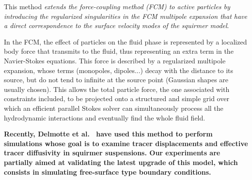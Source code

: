 This method \textit{extends the force-coupling method (FCM) to active particles by introducing the regularized singularities in the FCM multipole expansion that have a direct correspondence to the surface velocity modes of the squirmer model}.

In the FCM, the effect of particles on the fluid phase is represented by a localized body force that transmits to the fluid, thus representing an extra term in the Navier-Stokes equations. This force is described by a regularized multipole expansion, whose terms (monopoles, dipoles...) decay with the distance to its source, but do not tend to infinite at the source point (Gaussian shapes are usually chosen). This allows the total particle force, the one associated with constraints included, to be projected onto a structured and simple grid over which an efficient parallel Stokes solver can simultaneously process all the hydrodynamic interactions and eventually find the whole fluid field.

\textbf{Recently, Delmotte et al.~\cite{Delmotte2018} have used this method to perform simulations whose goal is to examine tracer displacements and effective tracer diffusivity in squirmer suspensions. Our experiments are partially aimed at validating the latest upgrade of this model, which consists in simulating free-surface type boundary conditions.}


